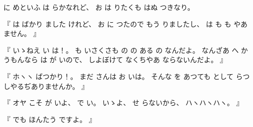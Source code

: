 %
に
めといふ
は%
らかなれど、
%
お
は
りたくも
はぬ
つきなり。

%
『
は
ばかり
ました
けれど、
%
お
に
つたので
もう
りましたし、
%
は
も
も
やあ
ません。
』

%
『
いゝねえ%
い
は！。
%
も
いさくさも
の
の
ある
の
なんだよ。
%
なんざあ
へ
かうもんなら
は
が
いので、
%
しよぼけて
なくちやあ
ならないんだよ。
』

%
『
ホヽヽ
ばつかり！。
%
まだ
さんは
お
いは。
%
そんな
を
あつても
として
らつしやるぢありませんか。
』

%
『
オヤ
こそ
が
いよ、
%
で
い。
%
いゝよ、%
%
せ
らないから、
%
ハヽハヽハヽ。
』

%
『
でも
ほんたう
ですよ。
』

